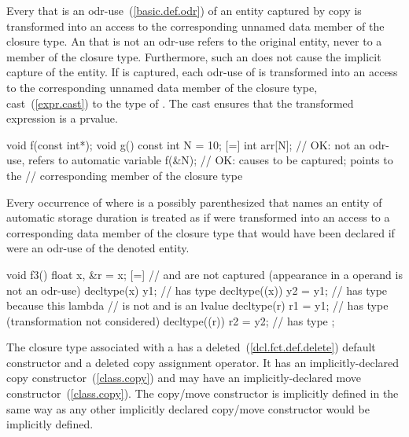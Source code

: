 \pnum
Every  that is an odr-use~(\ref{basic.def.odr}) of an
entity captured by copy is transformed into an access to the corresponding unnamed data
member of the closure type.
\enternote An  that is not an odr-use refers to
the original entity, never to a member of the closure type. Furthermore, such
an  does not cause the implicit capture of the
entity. \exitnote
If  is captured, each odr-use of  is
transformed into an access to the corresponding unnamed data member of the closure type,
cast~(\ref{expr.cast}) to the type of . \enternote The cast ensures that the
transformed expression is a prvalue. \exitnote \enterexample
\begin{codeblock}
void f(const int*);
void g() {
  const int N = 10;
  [=] {
    int arr[N];             // OK: not an odr-use, refers to automatic variable
    f(&N);                  // OK: causes  to be captured;  points to the
                            // corresponding member of the closure type
  }
}
\end{codeblock}
\exitexample

\pnum
Every occurrence of  where  is a possibly
parenthesized  that names an entity of automatic storage
duration is treated as if  were transformed into an access to a corresponding
data member of the closure type that would have been declared if  were an odr-use of
the denoted entity. \enterexample

\begin{codeblock}
void f3() {
  float x, &r = x;
  [=] {                     //  and  are not captured (appearance in a  operand is not an odr-use)
    decltype(x) y1;         //  has type 
    decltype((x)) y2 = y1;  //  has type  because this lambda
                            // is not  and  is an lvalue
    decltype(r) r1 = y1;    //  has type  (transformation not considered)
    decltype((r)) r2 = y2;  //  has type 
  };
}
\end{codeblock}
\exitexample

\pnum
The closure type associated with a  has a
deleted~(\ref{dcl.fct.def.delete})
default constructor and a deleted copy assignment operator. It has an
implicitly-declared copy constructor~(\ref{class.copy})
and may have an implicitly-declared move constructor~(\ref{class.copy}).
\enternote The copy/move constructor
is implicitly defined in the same way as any other implicitly declared copy/move constructor
would be implicitly defined. \exitnote

